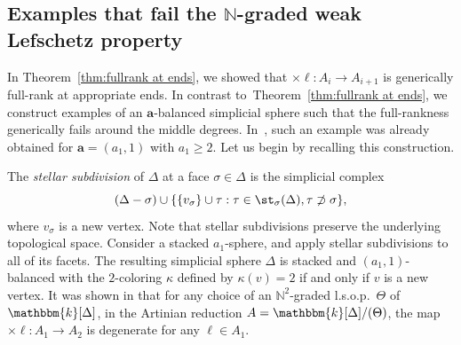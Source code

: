 \subsection{Examples that fail the \texorpdfstring{$\mathbb{N}$}{N}-graded weak Lefschetz property}
In Theorem~\ref{thm:fullrank at ends}, we showed that $\times\ell:A_i \rightarrow A_{i+1}$ is generically full-rank at appropriate ends.
In contrast to~Theorem~\ref{thm:fullrank at ends}, we construct examples of an $\bm{a}$-balanced simplicial sphere such that the full-rankness generically fails around the middle degrees.
In~\cite{CJMN,Oba}, such an example was already obtained for $\bm{a}=(a_1,1)$ with $a_1 \geq 2$. Let us begin by recalling this construction.

The \emph{stellar subdivision} of $\Delta$ at a face $\sigma \in \Delta$ is the simplicial complex 
\begin{equation*}
(\Delta -\sigma) \cup \{\{v_\sigma\} \cup \tau: \tau \in \st_{\sigma}(\Delta), \tau \not\supset \sigma \},
\end{equation*} 
where $v_\sigma$ is a new vertex.
Note that stellar subdivisions preserve the underlying topological space.
Consider a stacked $a_1$-sphere, and apply stellar subdivisions to all of its facets. 
The resulting simplicial sphere $\Delta$ is stacked and $(a_1,1)$-balanced with the $2$-coloring $\kappa$ defined by $\kappa(v)=2$ if and only if $v$ is a new vertex.
It was shown in \cite{CJMN,Oba} that for any choice of an $\mathbb{N}^2$-graded l.s.o.p.~$\Theta$ of $\mathbbm{k}[\Delta]$, in the Artinian reduction $A=\mathbbm{k}[\Delta]/(\Theta)$, the map $\times\ell:A_1 \rightarrow A_2$ is degenerate for any $\ell \in A_1$.

